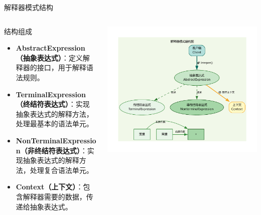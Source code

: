 \documentclass[UTF8,aspectratio=169]{beamer}
\begin{document}
\begin{frame}{解释器模式结构}
    \begin{columns}
        \begin{column}{0.38\textwidth}
            \begin{ytublock}{结构组成}
                \begin{itemize}
                    \item \textbf{AbstractExpression（抽象表达式）}：定义解释器的接口，用于解释语法规则。
                    \item \textbf{TerminalExpression（终结符表达式）}：实现抽象表达式的解释方法，处理最基本的语法单元。
                    \item \textbf{NonTerminalExpression（非终结符表达式）}：实现抽象表达式的解释方法，处理复合语法单元。
                    \item \textbf{Context（上下文）}：包含解释器需要的数据，传递给抽象表达式。
                \end{itemize}
            \end{ytublock}
        \end{column}
        \begin{column}{0.58\textwidth}
            \begin{center}
                \includegraphics[width=1.0\textwidth]{images/interpreter_pattern.pdf}
            \end{center}
        \end{column}
    \end{columns}
\end{frame}
\end{document}
